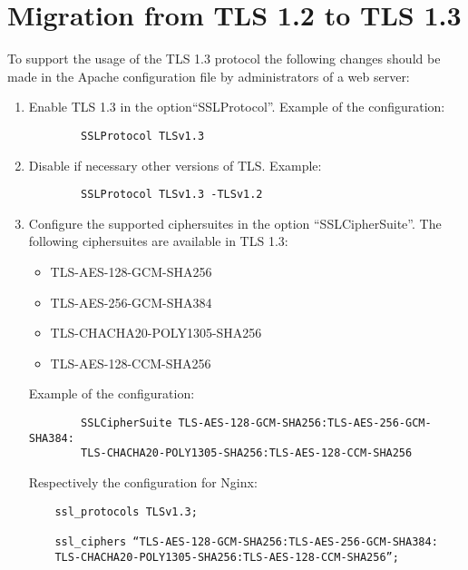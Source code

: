 \chapter{Migration from TLS 1.2 to TLS 1.3}
\label{chap:migration}

To support the usage of the TLS 1.3 protocol the following changes should be made in the Apache configuration file by administrators of a web server:\\
\begin{enumerate}
	\item Enable TLS 1.3 in the option“SSLProtocol”. Example of the configuration:
    \begin{verbatim}
        SSLProtocol TLSv1.3
    \end{verbatim}
    \item Disable if necessary other versions of TLS. Example: 
    \begin{verbatim}
        SSLProtocol TLSv1.3 -TLSv1.2
    \end{verbatim}
    \item Configure the supported ciphersuites in the option “SSLCipherSuite”. The following ciphersuites are available in TLS 1.3:
    \begin{itemize}
        \item TLS-AES-128-GCM-SHA256
        \item TLS-AES-256-GCM-SHA384
        \item TLS-CHACHA20-POLY1305-SHA256
        \item TLS-AES-128-CCM-SHA256
    \end{itemize}
    Example of the configuration:
    \begin{verbatim}
        SSLCipherSuite TLS-AES-128-GCM-SHA256:TLS-AES-256-GCM-SHA384:
        TLS-CHACHA20-POLY1305-SHA256:TLS-AES-128-CCM-SHA256
    \end{verbatim}
    Respectively the configuration for Nginx:
    \begin{verbatim}
    ssl_protocols TLSv1.3;
    
    ssl_ciphers “TLS-AES-128-GCM-SHA256:TLS-AES-256-GCM-SHA384:
    TLS-CHACHA20-POLY1305-SHA256:TLS-AES-128-CCM-SHA256”;
    \end{verbatim}

\end{enumerate}


